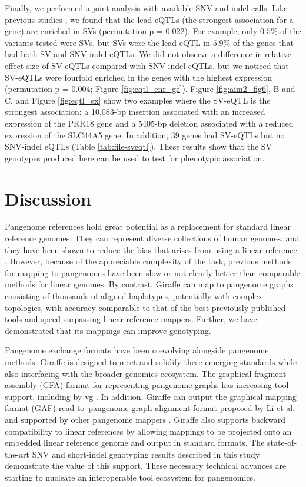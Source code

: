 \documentclass[11pt]{ucscthesis}
\begin{document}
Finally, we performed a joint analysis with available SNV and indel calls. 
Like previous studies \cite{gtex_sv_2017,Ebert2021}, we found that the lead eQTLs (the strongest association for a gene) are enriched in SVs (permutation p = 0.022).
For example, only $0.5\%$ of the variants tested were SVs, but SVs were the lead eQTL in $5.9\%$ of the genes that had both SV and SNV-indel eQTLs.
We did not observe a difference in relative effect size of SV-eQTLs compared with SNV-indel eQTLs, but we noticed that SV-eQTLs were fourfold enriched in the genes with the highest expression (permutation p = 0.004; Figure \ref{fig:eqtl_enr_ge}).
Figure \ref{fig:aim2_fig6}, B and C, and Figure \ref{fig:eqtl_ex} show two examples where the SV-eQTL is the strongest association: a 10,083-bp insertion associated with an increased expression of the PRR18 gene and a 5405-bp deletion associated with a reduced expression of the SLC44A5 gene.
In addition, 39 genes had SV-eQTLs but no SNV-indel eQTLs (Table \ref{tab:file-sveqtl}).
These results show that the SV genotypes produced here can be used to test for phenotypic association.

\section{Discussion}
Pangenome references hold great potential as a replacement for standard linear reference genomes.
They can represent diverse collections of human genomes, and they have been shown to reduce the bias that arises from using a linear reference \cite{garrison_variation_2018}.
However, because of the appreciable complexity of the task, previous methods for mapping to pangenomes have been slow or not clearly better than comparable methods for linear genomes.
By contrast, Giraffe can map to pangenome graphs consisting of thousands of aligned haplotypes, potentially with complex topologies, with accuracy comparable to that of the best previously published tools and speed surpassing linear reference mappers.
Further, we have demonstrated that its mappings can improve genotyping.

Pangenome exchange formats have been coevolving alongside pangenome methods.
Giraffe is designed to meet and solidify these emerging standards while also interfacing with the broader genomics ecosystem.
The graphical fragment assembly (GFA) format for representing pangenome graphs has increasing tool support, including by vg \cite{rautiainen_graphaligner_2020,li_minigraph_2020,koren_canu_2017,li_minimap_2016,wick_bandage_2015,spades_2020}.
In addition, Giraffe can output the graphical mapping format (GAF) read-to–pangenome graph alignment format proposed by Li et al. \cite{li_minigraph_2020} and supported by other pangenome mappers \cite{rautiainen_graphaligner_2020}.
Giraffe also supports backward compatibility to linear references by allowing mappings to be projected onto an embedded linear reference genome and output in standard formats.
The state-of-the-art SNV and short-indel genotyping results described in this study demonstrate the value of this support.
These necessary technical advances are starting to nucleate an interoperable tool ecosystem for pangenomics.
\end{document}
